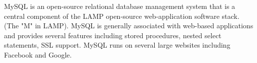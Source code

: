 MySQL is an open-source relational database management system that is a 
central component of the LAMP open-source web-application software stack. 
(The "M" in LAMP).  \cite{hid-sp18-407-mysql}  MySQL is generally 
associated with web-based applications and provides several features including
stored procedures, nested select statements, SSL support. \cite{hid-sp18-407-mysql}
MySQL runs on several large websites including Facebook and Google. \cite{hid-sp18-407-mysql}
